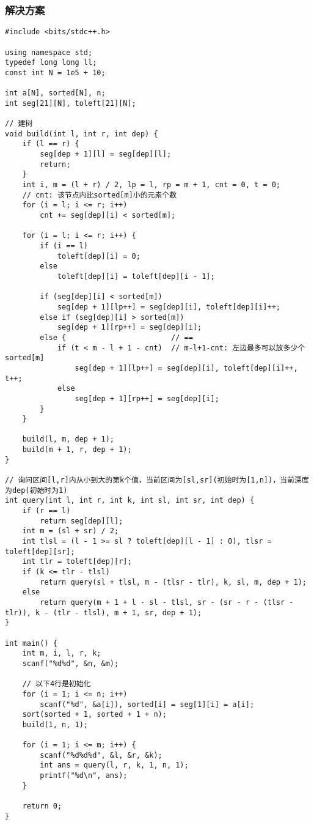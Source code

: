    \subsubsection{解决方案}
\begin{lstlisting}
#include <bits/stdc++.h>

using namespace std;
typedef long long ll;
const int N = 1e5 + 10;

int a[N], sorted[N], n;
int seg[21][N], toleft[21][N];

// 建树
void build(int l, int r, int dep) {
    if (l == r) {
        seg[dep + 1][l] = seg[dep][l];
        return;
    }
    int i, m = (l + r) / 2, lp = l, rp = m + 1, cnt = 0, t = 0;
    // cnt: 该节点内比sorted[m]小的元素个数
    for (i = l; i <= r; i++)
        cnt += seg[dep][i] < sorted[m];

    for (i = l; i <= r; i++) {
        if (i == l)
            toleft[dep][i] = 0;
        else
            toleft[dep][i] = toleft[dep][i - 1];

        if (seg[dep][i] < sorted[m])
            seg[dep + 1][lp++] = seg[dep][i], toleft[dep][i]++;
        else if (seg[dep][i] > sorted[m])
            seg[dep + 1][rp++] = seg[dep][i];
        else {                        // ==
            if (t < m - l + 1 - cnt)  // m-l+1-cnt: 左边最多可以放多少个sorted[m]
                seg[dep + 1][lp++] = seg[dep][i], toleft[dep][i]++, t++;
            else
                seg[dep + 1][rp++] = seg[dep][i];
        }
    }

    build(l, m, dep + 1);
    build(m + 1, r, dep + 1);
}

// 询问区间[l,r]内从小到大的第k个值，当前区间为[sl,sr](初始时为[1,n])，当前深度为dep(初始时为1)
int query(int l, int r, int k, int sl, int sr, int dep) {
    if (r == l)
        return seg[dep][l];
    int m = (sl + sr) / 2;
    int tlsl = (l - 1 >= sl ? toleft[dep][l - 1] : 0), tlsr = toleft[dep][sr];
    int tlr = toleft[dep][r];
    if (k <= tlr - tlsl)
        return query(sl + tlsl, m - (tlsr - tlr), k, sl, m, dep + 1);
    else
        return query(m + 1 + l - sl - tlsl, sr - (sr - r - (tlsr - tlr)), k - (tlr - tlsl), m + 1, sr, dep + 1);
}

int main() {
    int m, i, l, r, k;
    scanf("%d%d", &n, &m);

    // 以下4行是初始化
    for (i = 1; i <= n; i++)
        scanf("%d", &a[i]), sorted[i] = seg[1][i] = a[i];
    sort(sorted + 1, sorted + 1 + n);
    build(1, n, 1);

    for (i = 1; i <= m; i++) {
        scanf("%d%d%d", &l, &r, &k);
        int ans = query(l, r, k, 1, n, 1);
        printf("%d\n", ans);
    }

    return 0;
}
\end{lstlisting}